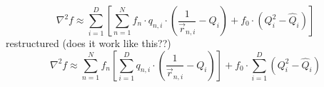 \begin{equation}
	\nabla^2 f \approx \sum_{i = 1}^D \left[ \sum_{n = 1}^N f_n \cdot q_{n, i} \cdot \left( \frac{1}{\vec{r}_{n, i}} - Q_i \right) + f_0 \cdot \left( Q_i^2 - \hat{Q}_i \right) \right]
\end{equation}
restructured (does it work like this??)
\begin{equation}
	\nabla^2 f \approx \sum_{n = 1}^N f_n \left[ \sum_{i = 1}^D q_{n, i} \cdot \left( \frac{1}{\vec{r}_{n, i}} - Q_i \right) \right] + f_0 \cdot \sum_{i = 1}^D \left( Q_i^2 - \hat{Q}_i \right)
\end{equation}

